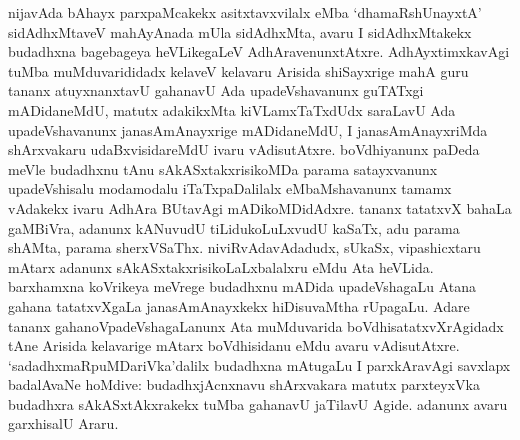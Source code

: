 nijavAda bAhayx parxpaMcakekx asitxtavxvilalx eMba `dhamaRshUnayxtA' sidAdhxMtaveV mahAyAnada mUla sidAdhxMta, avaru I sidAdhxMtakekx budadhxna bagebageya heVLikegaLeV AdhAravenunxtAtxre. AdhAyxtimxkavAgi tuMba muMduvarididadx kelaveV kelavaru Arisida shiSayxrige mahA guru tananx atuyxnanxtavU gahanavU Ada upadeVshavanunx guTATxgi mADidaneMdU, matutx adakikxMta kiVLamxTaTxdUdx saraLavU Ada upadeVshavanunx janasAmAnayxrige mADidaneMdU, I janasAmAnayxriMda shArxvakaru udaBxvisidareMdU ivaru vAdisutAtxre. boVdhiyanunx paDeda meVle budadhxnu tAnu sAkASxtakxrisikoMDa parama satayxvanunx upadeVshisalu modamodalu iTaTxpaDalilalx eMbaMshavanunx tamamx vAdakekx ivaru AdhAra BUtavAgi mADikoMDidAdxre. tananx tatatxvX bahaLa gaMBiVra, adanunx kANuvudU tiLidukoLuLxvudU kaSaTx, adu parama shAMta, parama sherxVSaThx. niviRvAdavAdadudx, sUkaSx, vipashicxtaru mAtarx adanunx sAkASxtakxrisikoLaLxbalalxru eMdu Ata heVLida. barxhamxna koVrikeya meVrege budadhxnu mADida upadeVshagaLu Atana gahana tatatxvXgaLa janasAmAnayxkekx hiDisuvaMtha rUpagaLu. Adare tananx gahanoVpadeVshagaLanunx Ata muMduvarida boVdhisatatxvXrAgidadx tAne Arisida kelavarige mAtarx boVdhisidanu eMdu avaru vAdisutAtxre. `sadadhxmaRpuMDariVka'dalilx budadhxna mAtugaLu I parxkAravAgi savxlapx badalAvaNe hoMdive: budadhxjAcnxnavu shArxvakara matutx parxteyxVka budadhxra sAkASxtAkxrakekx tuMba gahanavU jaTilavU Agide. adanunx avaru garxhisalU Araru.


